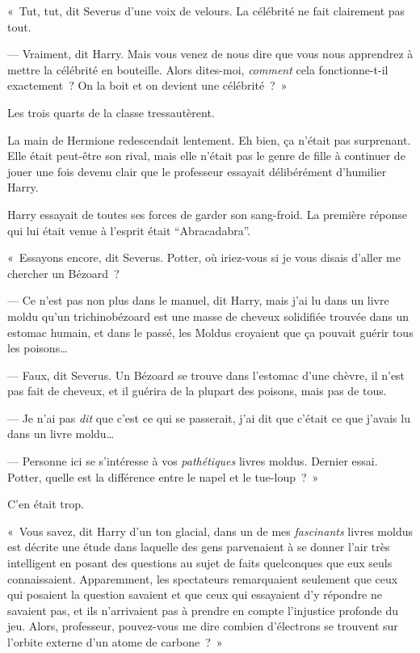 «~Tut, tut, dit Severus d'une voix de velours. La célébrité ne fait clairement pas tout.

--- Vraiment, dit Harry. Mais vous venez de nous dire que vous nous apprendrez à mettre la célébrité en bouteille. Alors dites-moi, \emph{comment} cela fonctionne-t-il exactement~? On la boit et on devient une célébrité~?~»

Les trois quarts de la classe tressautèrent.

La main de Hermione redescendait lentement. Eh bien, ça n'était pas surprenant. Elle était peut-être son rival, mais elle n'était pas le genre de fille à continuer de jouer une fois devenu clair que le professeur essayait délibérément d'humilier Harry.

Harry essayait de toutes ses forces de garder son sang-froid. La première réponse qui lui était venue à l'esprit était “Abracadabra”.

«~Essayons encore, dit Severus. Potter, où iriez-vous si je vous disais d'aller me chercher un Bézoard~?

--- Ce n'est pas non plus dans le manuel, dit Harry, mais j'ai lu dans un livre moldu qu'un trichinobézoard est une masse de cheveux solidifiée trouvée dans un estomac humain, et dans le passé, les Moldus croyaient que ça pouvait guérir tous les poisons…

--- Faux, dit Severus. Un Bézoard se trouve dans l'estomac d'une chèvre, il n'est pas fait de cheveux, et il guérira de la plupart des poisons, mais pas de tous.

--- Je n'ai pas \emph{dit} que c'est ce qui se passerait, j'ai dit que c'était ce que j'avais lu dans un livre moldu…

--- Personne ici se s'intéresse à vos \emph{pathétiques} livres moldus. Dernier essai. Potter, quelle est la différence entre le napel et le tue-loup~?~»

C'en était trop.

«~Vous savez, dit Harry d'un ton glacial, dans un de mes \emph{fascinants} livres moldus est décrite une étude dans laquelle des gens parvenaient à se donner l'air très intelligent en posant des questions au sujet de faits quelconques que eux seuls connaissaient. Apparemment, les spectateurs remarquaient seulement que ceux qui posaient la question savaient et que ceux qui essayaient d'y répondre ne savaient pas, et ils n'arrivaient pas à prendre en compte l'injustice profonde du jeu. Alors, professeur, pouvez-vous me dire combien d'électrons se trouvent sur l'orbite externe d'un atome de carbone~?~»


